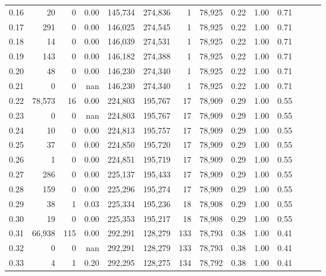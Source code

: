 \begin{tabular}{rrrrrrrrrrrrrr}
0.16 &      20 &       0 &  0.00 &  145,734 &  274,836 &       1 &  78,925 &  0.22 &  1.00 &      0.71 \\
0.17 &     291 &       0 &  0.00 &  146,025 &  274,545 &       1 &  78,925 &  0.22 &  1.00 &      0.71 \\
0.18 &      14 &       0 &  0.00 &  146,039 &  274,531 &       1 &  78,925 &  0.22 &  1.00 &      0.71 \\
0.19 &     143 &       0 &  0.00 &  146,182 &  274,388 &       1 &  78,925 &  0.22 &  1.00 &      0.71 \\
0.20 &      48 &       0 &  0.00 &  146,230 &  274,340 &       1 &  78,925 &  0.22 &  1.00 &      0.71 \\
0.21 &       0 &       0 &   nan &  146,230 &  274,340 &       1 &  78,925 &  0.22 &  1.00 &      0.71 \\
0.22 &  78,573 &      16 &  0.00 &  224,803 &  195,767 &      17 &  78,909 &  0.29 &  1.00 &      0.55 \\
0.23 &       0 &       0 &   nan &  224,803 &  195,767 &      17 &  78,909 &  0.29 &  1.00 &      0.55 \\
0.24 &      10 &       0 &  0.00 &  224,813 &  195,757 &      17 &  78,909 &  0.29 &  1.00 &      0.55 \\
0.25 &      37 &       0 &  0.00 &  224,850 &  195,720 &      17 &  78,909 &  0.29 &  1.00 &      0.55 \\
0.26 &       1 &       0 &  0.00 &  224,851 &  195,719 &      17 &  78,909 &  0.29 &  1.00 &      0.55 \\
0.27 &     286 &       0 &  0.00 &  225,137 &  195,433 &      17 &  78,909 &  0.29 &  1.00 &      0.55 \\
0.28 &     159 &       0 &  0.00 &  225,296 &  195,274 &      17 &  78,909 &  0.29 &  1.00 &      0.55 \\
0.29 &      38 &       1 &  0.03 &  225,334 &  195,236 &      18 &  78,908 &  0.29 &  1.00 &      0.55 \\
0.30 &      19 &       0 &  0.00 &  225,353 &  195,217 &      18 &  78,908 &  0.29 &  1.00 &      0.55 \\
0.31 &  66,938 &     115 &  0.00 &  292,291 &  128,279 &     133 &  78,793 &  0.38 &  1.00 &      0.41 \\
0.32 &       0 &       0 &   nan &  292,291 &  128,279 &     133 &  78,793 &  0.38 &  1.00 &      0.41 \\
0.33 &       4 &       1 &  0.20 &  292,295 &  128,275 &     134 &  78,792 &  0.38 &  1.00 &      0.41 \\

\end{tabular}
